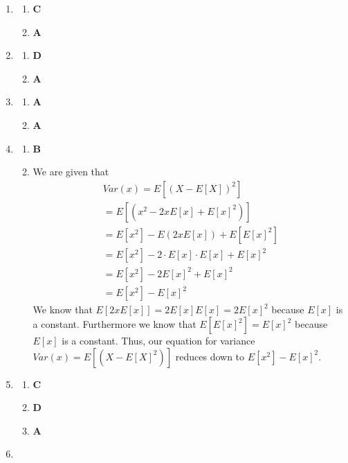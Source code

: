 \documentclass[12pt]{article}
\begin{document}
\begin{enumerate}
\item %
\begin{enumerate}
\item \textbf{C}
\item \textbf{A}
\end{enumerate}

\item
\begin{enumerate}
\item \textbf{D}
\item \textbf{A}
\end{enumerate}

\item
  \begin{enumerate}
  \item \textbf{A}
  \item \textbf{A}
  \end{enumerate}

\item
  \begin{enumerate}
  \item \textbf{B}
  \item We are given that 
  \begin{align}
    Var(x) = E[(X-E[X])^{2}] \\ 
    = E[(x^{2} - 2xE[x] + E[x]^{2})] \\ 
    = E[x^2] - E(2xE[x]) + E[E[x]^2] \\ 
    = E[x^2] - 2 \cdot E[x] \cdot E[x] + E[x]^2 \\
    = E[x^2] - 2E[x]^2 + E[x]^2 \\ 
    = E[x^2] - E[x]^2
  \end{align}
  We know that $E[2xE[x]] = 2E[x]E[x] = 2E[x]^2$ because $E[x]$ is a constant. Furthermore
  we know that $E[E[x]^2] = E[x]^2$ because $E[x]$ is a constant. Thus, our equation for variance 
  $Var(x) = E[(X-E[X]^2)]$ reduces down to $E[x^2] - E[x]^2$.
  \end{enumerate}
 \item
 \begin{enumerate}
     \item \textbf{C}
     \item \textbf{D}
     \item \textbf{A}
 \end{enumerate}
\item 
 \begin{enumerate}
    

\end{enumerate}
\end{enumerate}
\end{document}
